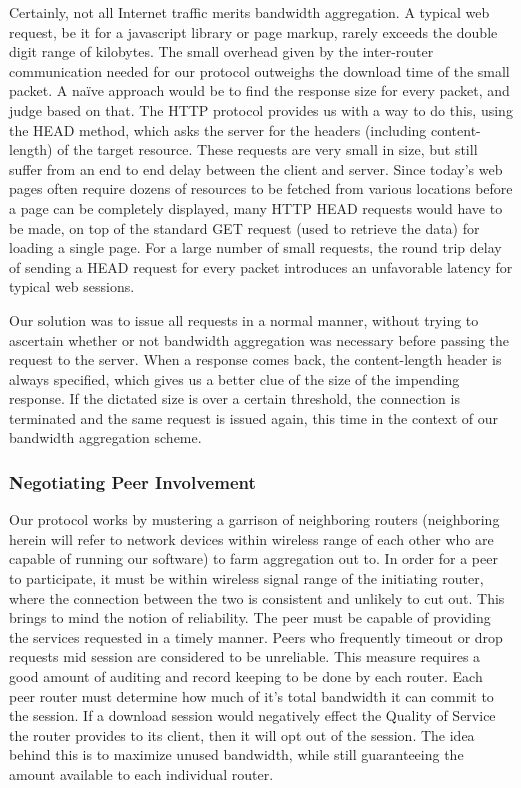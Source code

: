 \documentclass[12pt]{article}
\begin{document}
			Certainly, not all Internet traffic merits bandwidth aggregation. A typical web request, be it for a javascript library or page markup, rarely exceeds the double digit range of kilobytes. The small overhead given by the inter-router communication needed for our protocol outweighs the download time of the small packet. A na\"{i}ve approach would be to find the response size for every packet, and judge based on that. The HTTP protocol provides us with a way to do this, using the HEAD method, which asks the server for the headers (including content-length) of the target resource. These requests are very small in size, but still suffer from an end to end delay between the client and server. Since today's web pages often require dozens of resources to be fetched from various locations before a page can be completely displayed, many HTTP HEAD requests would have to be made, on top of the standard GET request (used to retrieve the data) for loading a single page. For a large number of small requests, the round trip delay of sending a HEAD request for every packet introduces an unfavorable latency for typical web sessions. 

			Our solution was to issue all requests in a normal manner, without trying to ascertain whether or not bandwidth aggregation was necessary before passing the request to the server. When a response comes back, the content-length header is always specified, which gives us a better clue of the size of the impending response. If the dictated size is over a certain threshold, the connection is terminated and the same request is issued again, this time in the context of our bandwidth aggregation scheme.

		\subsubsection{Negotiating Peer Involvement}

			Our protocol works by mustering a garrison of neighboring routers (neighboring herein will refer to network devices within wireless range of each other who are capable of running our software) to farm aggregation out to. In order for a peer to participate, it must be within wireless signal range of the initiating router, where the connection between the two is consistent and unlikely to cut out. This brings to mind the notion of reliability. The peer must be capable of providing the services requested in a timely manner. Peers who frequently timeout or drop requests mid session are considered to be unreliable. This measure requires a good amount of auditing and record keeping to be done by each router. Each peer router must determine how much of it's total bandwidth it can commit to the session. If a download session would negatively effect the Quality of Service the router provides to its client, then it will opt out of the session. The idea behind this is to maximize unused bandwidth, while still guaranteeing the amount available to each individual router.
\end{document}
